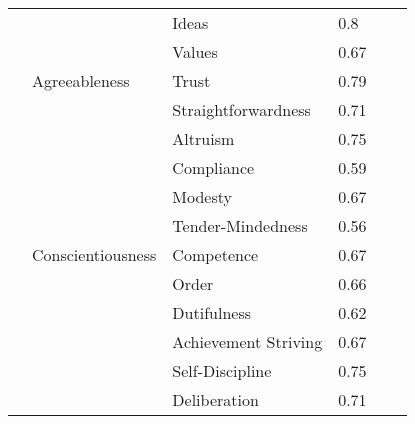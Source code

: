 \documentclass[man]{apa6}
\theoremstyle{definition}
\theoremstyle{definition}
\theoremstyle{definition}
\theoremstyle{remark}
\begin{document}
\begin{table}[1]
\begin{tabular}{llllll}
         &                   & Ideas                & 0.8         &          &              \\
         &                   & Values               & 0.67        &          &              \\
         & Agreeableness     & Trust                & 0.79        &          &              \\
         &                   & Straightforwardness  & 0.71        &          &              \\
         &                   & Altruism             & 0.75        &          &              \\
         &                   & Compliance           & 0.59        &          &              \\
         &                   & Modesty              & 0.67        &          &              \\
         &                   & Tender-Mindedness    & 0.56        &          &              \\
         & Conscientiousness & Competence           & 0.67        &          &              \\
         &                   & Order                & 0.66        &          &              \\
         &                   & Dutifulness          & 0.62        &          &              \\
         &                   & Achievement Striving & 0.67        &          &              \\
         &                   & Self-Discipline      & 0.75        &          &              \\
         &                   & Deliberation         & 0.71        &          &             
\end{tabular}
\end{table}
\end{document}
